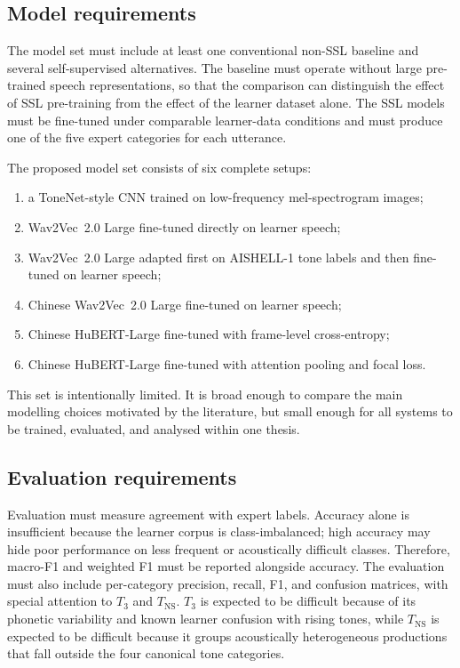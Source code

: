 \subsection{Model requirements}
\label{sec:proposal:requirements:model}

The model set must include at least one conventional non-SSL baseline and
several self-supervised alternatives. The baseline must operate without large
pre-trained speech representations, so that the comparison can distinguish the
effect of SSL pre-training from the effect of the learner dataset alone. The SSL
models must be fine-tuned under comparable learner-data conditions and must
produce one of the five expert categories for each utterance.

The proposed model set consists of six complete setups:

\begin{enumerate}[leftmargin=1.2cm]
  \item a ToneNet-style CNN trained on low-frequency mel-spectrogram images;
  \item Wav2Vec~2.0 Large fine-tuned directly on learner speech;
  \item Wav2Vec~2.0 Large adapted first on AISHELL-1 tone labels and then
  fine-tuned on learner speech;
  \item Chinese Wav2Vec~2.0 Large fine-tuned on learner speech;
  \item Chinese HuBERT-Large fine-tuned with frame-level cross-entropy;
  \item Chinese HuBERT-Large fine-tuned with attention pooling and focal loss.
\end{enumerate}

This set is intentionally limited. It is broad enough to compare the main
modelling choices motivated by the literature, but small enough for all systems
to be trained, evaluated, and analysed within one thesis.

\subsection{Evaluation requirements}
\label{sec:proposal:requirements:evaluation}

Evaluation must measure agreement with expert labels. Accuracy alone is
insufficient because the learner corpus is class-imbalanced; high accuracy may
hide poor performance on less frequent or acoustically difficult classes.
Therefore, macro-F1 and weighted F1 must be reported alongside accuracy. The
evaluation must also include per-category precision, recall, F1, and confusion
matrices, with special attention to \(T_3\) and \(T_{\mathrm{NS}}\). \(T_3\) is
expected to be difficult because of its phonetic variability and known learner
confusion with rising tones, while \(T_{\mathrm{NS}}\) is expected to be
difficult because it groups acoustically heterogeneous productions that fall
outside the four canonical tone categories.

